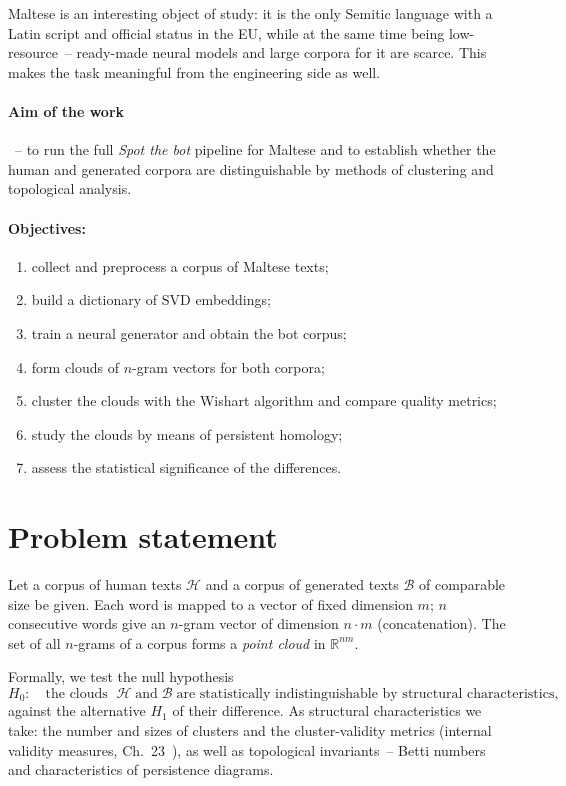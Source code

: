 \documentclass[12pt,a4paper]{article}
\begin{document}
Maltese is an interesting object of study: it is the only Semitic language with
a Latin script and official status in the EU, while at the same time being
low-resource~-- ready-made neural models and large corpora for it are scarce.
This makes the task meaningful from the engineering side as well.

\paragraph{Aim of the work}~-- to run the full \emph{Spot the bot} pipeline for
Maltese and to establish whether the human and generated corpora are
distinguishable by methods of clustering and topological analysis.

\paragraph{Objectives:}
\begin{enumerate}[nosep]
  \item collect and preprocess a corpus of Maltese texts;
  \item build a dictionary of SVD embeddings;
  \item train a neural generator and obtain the bot corpus;
  \item form clouds of $n$-gram vectors for both corpora;
  \item cluster the clouds with the Wishart algorithm and compare quality
        metrics;
  \item study the clouds by means of persistent homology;
  \item assess the statistical significance of the differences.
\end{enumerate}

\section{Problem statement}

Let a corpus of human texts $\mathcal{H}$ and a corpus of generated texts
$\mathcal{B}$ of comparable size be given. Each word is mapped to a vector of
fixed dimension $m$; $n$ consecutive words give an $n$-gram vector of dimension
$n\cdot m$ (concatenation). The set of all $n$-grams of a corpus forms a
\emph{point cloud} in $\mathbb{R}^{nm}$.

Formally, we test the null hypothesis
\[
  H_0:\quad \text{the clouds }\;\mathcal{H}\;\text{and}\;\mathcal{B}\;
  \text{are statistically indistinguishable by structural characteristics,}
\]
against the alternative $H_1$ of their difference. As structural characteristics
we take: the number and sizes of clusters and the cluster-validity metrics
(internal validity measures, Ch.~23~\cite{aggarwal2013}), as well as
topological invariants~-- Betti numbers and characteristics of persistence
diagrams.
\end{document}
